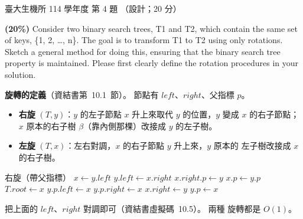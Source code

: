 \begin{pastexam}[label={px:ntu-114-bime-ds-04}]{臺大生機所 114 學年度 第 4 題}
（設計；20 分）

\textbf{(20\%)} Consider two binary search trees, T1 and T2, which contain the same set of keys,
\{1, 2, \ldots, n\}. The goal is to transform T1 to T2 using only rotations. Sketch a general method
for doing this, ensuring that the binary search tree property is maintained. Please first clearly
define the rotation procedures in your solution.
\end{pastexam}

\begin{pastsoln}
\textbf{旋轉的定義}（資結書第~10.1~節）。 節點有 $\mathit{left}$、$\mathit{right}$、父指標 $p$。
\begin{itemize}
\item \textbf{右旋} $(T, y)$：$y$ 的左子節點 $x$ 升上來取代 $y$ 的位置，$y$
變成 $x$ 的右子節點；$x$ 原本的右子樹 $\beta$（靠內側那棵）改接成 $y$ 的左子樹。
\item \textbf{左旋} $(T, x)$：左右對調，$x$ 的右子節點 $y$ 升上來，$y$ 原本的
左子樹改接成 $x$ 的右子樹。
\end{itemize}
\begin{center}
\end{center}
\begin{pseudo}{右旋（帶父指標）}
    \State $x \gets y.\mathit{left}$
    \State $y.\mathit{left} \gets x.\mathit{right}$ 
        \State $x.\mathit{right}.p \gets y$
    \EndIf
    \State $x.p \gets y.p$ 
        \State $T.\mathit{root} \gets x$
        \State $y.p.\mathit{left} \gets x$
    \Else
        \State $y.p.\mathit{right} \gets x$
    \EndIf
    \State $x.\mathit{right} \gets y$
    \State $y.p \gets x$
\EndProcedure
\end{pseudo}
 把上面的 $\mathit{left}$、$\mathit{right}$ 對調即可（資結書虛擬碼~10.5）。 兩種
旋轉都是 $O(1)$。


\end{pastsoln}
